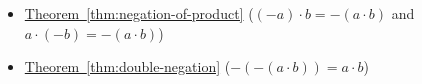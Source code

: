 \begin{dependencies}
\begin{itemize}
  \item \hyperref[thm:negation-of-product]{Theorem~\ref*{thm:negation-of-product}}
        \textnormal{($(-a)\cdot b = -(a\cdot b)$ and $a\cdot(-b) = -(a\cdot b)$)}
  \item \hyperref[thm:double-negation]{Theorem~\ref*{thm:double-negation}}
        \textnormal{($-(-(a\cdot b)) = a\cdot b$)}
\end{itemize}
\end{dependencies}
